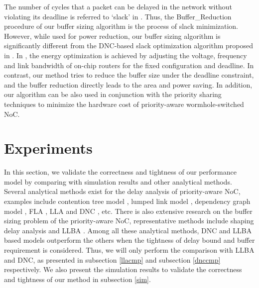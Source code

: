 \documentclass[preprint]{elsarticle}
\begin{document}
The number of cycles that a packet can be delayed in the network without violating its deadline is referred to `slack' in \cite{6560630}. Thus, the Buffer\_Reduction procedure of our buffer sizing algorithm is the process of slack minimization. However, while used for power reduction, our buffer sizing algorithm is significantly different from the DNC-based slack optimization algorithm proposed in \cite{6560630}. In \cite{6560630}, the energy optimization is achieved by adjusting the voltage, frequency and link bandwidth of on-chip routers for the fixed configuration and deadline. In contrast, our method tries to reduce the buffer size under the deadline constraint, and the buffer reduction directly leads to the area and power saving. In addition, our algorithm can be also used in conjunction with the priority sharing techniques \cite{5161497} to minimize the hardware cost of priority-aware wormhole-switched NoC.

\section{Experiments}\label{experiments}
In this section, we validate the correctness and tightness of our performance model by comparing with simulation results and other analytical methods. Several analytical methods exist for the delay analysis of priority-aware NoC, examples include contention tree model \cite{LuJS05}, lumped link model \cite{707545}, dependency graph model \cite{708526}, FLA \cite{Shi:2008:RCA:1397757.1397996}, LLA \cite{73} and DNC \cite{Qian489900}, etc. There is also extensive research on the buffer sizing problem of the priority-aware NoC, representative methods include shaping delay analysis \cite{Manolache:2006:BSO:1131481.1131683} and LLBA \cite{189}. Among all these analytical methods, DNC \cite{Qian489900} and LLBA \cite{189} based models outperform the others when the tightness of delay bound and buffer requirement is considered. Thus, we will only perform the comparison with LLBA and DNC, as presented in subsection \ref{llacmp} and subsection \ref{dnccmp} respectively. We also present the simulation results to validate the correctness and tightness of our method in subsection \ref{sim}.
\end{document}
